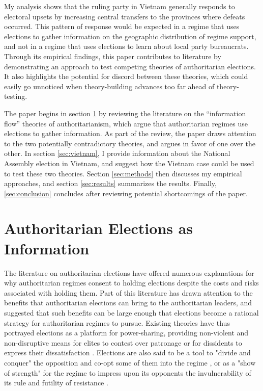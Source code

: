 \documentclass[12pt]{article}\usepackage[]{graphicx}\usepackage[]{color}
\newcommand{\1}{\mathbbm{1}}
\begin{document}
My analysis shows that the ruling party in Vietnam generally responds to electoral upsets by increasing central transfers to the provinces where defeats occurred. This pattern of response would be expected in a regime that uses elections to gather information on the geographic distribution of regime support, and not in a regime that uses elections to learn about local party bureaucrats. Through its empirical findings, this paper contributes to literature by demonstrating an approach to test competing theories of authoritarian elections. It also highlights the potential for discord between these theories, which could easily go unnoticed when theory-building advances too far ahead of theory-testing. 

The paper begins in section \ref{sec:info} by reviewing the literature on the ``information flow'' theories of authoritarianism, which argue that authoritarian regimes use elections to gather information. As part of the review, the paper draws attention to the two potentially contradictory theories, and argues in favor of one over the other. In section \ref{sec:vietnam}, I provide information about the National Assembly election in Vietnam, and suggest how the Vietnam case could be used to test these two theories. Section \ref{sec:methods} then discusses my empirical approaches, and section \ref{sec:results} summarizes the results. Finally, \ref{sec:conclusion} concludes after reviewing potential shortcomings of the paper.


\section{Authoritarian Elections as Information}
\label{sec:info}
The literature on authoritarian elections have offered numerous explanations for why authoritarian regimes consent to holding elections despite the costs and risks associated with holding them. Part of this literature has drawn attention to the benefits that authoritarian elections can bring to the authoritarian leaders, and suggested that such benefits can be large enough that elections become a rational strategy for authoritarian regimes to pursue. Existing theories have thus portrayed elections as a platform for power-sharing, providing non-violent and non-disruptive means for elites to contest over patronage \citep{LustOkar2006} or for dissidents to express their dissatisfaction \citep{AR2005}. Elections are also said to be a tool to "divide and conquer" the opposition and co-opt some of them into the regime \citep{LustOkar2005}, or as a "show of strength" for the regime to impress upon its opponents the invulnerability of its rule and futility of resistance \citep{Geddes2005}. 
\end{document}
